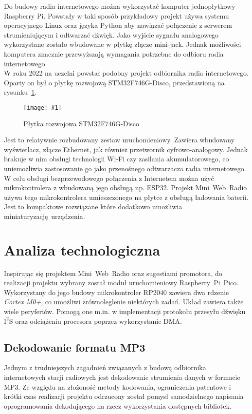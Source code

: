 \documentclass[polish]{aghengthesis}
\newcommand{\imgint}[4]{
	\begin{figure}[{#4}]
		\centering
		\texttt{[image: \#1]}
		\caption{#2}
		\label{#1}
	\end{figure}
}
\newcommand{\imgh}[3]{\imgint{#1}{#2}{#3}{H}}
\newcommand{\isqs}{$\text{I}^{2}\text{S}$}
\begin{document}
		Do budowy radia internetowego można wykorzystać komputer jednopłytkowy Raspberry Pi. Powstały w taki sposób przykładowy projekt\textsuperscript{\cite{rpi_sbc_radio}} używa systemu operacyjnego Linux oraz języka Python aby nawiązać połączenie z serwerem strumieniującym i odtwarzać dźwięk. Jako wyjście sygnału analogowego wykorzystane zostało wbudowane w płytkę złącze mini-jack.
		Jednak możliwości komputera znacznie przewyższają wymagania potrzebne do odbioru radia internetowego.
		$ $\\
		
		W roku 2022 na uczelni powstał podobny projekt odbiornika radia internetowego\textsuperscript{\cite{apd_radio2}}. Oparty on był o płytkę rozwojową STM32F746G-Disco, przedstawioną na rysunku~\ref{1/botland_stm}. 
		\imgh{1/botland_stm}{Płytka rozwojowa STM32F746G-Disco\textsuperscript{\cite{botland_stm}}}{0.6}
		Jest to relatywnie rozbudowany zestaw uruchomieniowy. Zawiera wbudowany wyświetlacz, złącze Ethernet, jak również przetwornik cyfrowo-analogowy. Jednak brakuje w nim obsługi technologii Wi-Fi czy zasilania akumulatorowego, co uniemożliwia zastosowanie go jako przenośnego odtwarzacza radia internetowego.
		$ $\\
		
		W celu obsługi bezprzewodowego połączenia z Internetem można użyć mikrokontrolera z wbudowaną jego obsługą np. ESP32. Projekt Mini~Web~Radio\textsuperscript{\cite{esp32_radio}} używa tego mikrokontrolera umieszczonego na płytce z obsługą ładowania baterii. Jest to kompaktowe rozwiązane które dodatkowo umożliwia miniaturyzację urządzenia.
	
	\section{Analiza technologiczna}
		Inspirując się projektem Mini~Web~Radio oraz sugestiami promotora, do realizacji projektu wybrany został moduł uruchomieniowy Raspberry~Pi~Pico.
		Wykorzystany do jego budowy mikrokontroler RP2040\textsuperscript{\cite{rp2040}} zawiera dwa rdzenie \textit{Cortex M0+}, co umożliwi zrównoleglenie niektórych zadań.
		Układ zawiera także wiele peryferiów. Pomogą one m.in. w implementacji protokołu przesyłu dźwięku \isqs{} oraz odciążeniu procesora poprzez wykorzystanie DMA.
		
		\subsection{Dekodowanie formatu MP3}
			Jednym z trudniejszych zagadnień związanych z budową odbiornika internetowych stacji radiowych jest dekodowanie strumienia danych w formacie MP3. Ze względu na złożoność metody kodowania, ograniczenia patentowe i  krótki czas realizacji projektu odrzucony został pomysł samodzielnego napisania oprogramowania dekodującego na rzecz wykorzystania dostępnych bibliotek.
			$ $\\
			
\end{document}
